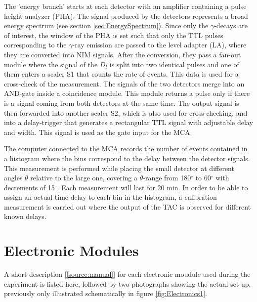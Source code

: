 \documentclass[a4paper,parskip,11pt, DIV12]{scrreprt}
\begin{document}
 The 'energy branch' starts at each detector with an amplifier containing a pulse height analyzer (PHA). The signal produced by the detectors represents a broad energy spectrum (see section \ref{sec:EnergySpectrum}). Since only the $\gamma$-decays are of interest, the window of the PHA is set such that only the TTL pulses corresponding to the $\gamma$-ray emission are passed to the level adapter (LA), where they are converted into NIM signals. After the conversion, they pass a fan-out module where the signal of the $D_l$ is split into two identical pulses and one of them enters a scaler S1 that counts the rate of events. This data is used for a cross-check of the measurement. The signals of the two detectors merge into an AND-gate inside a coincidence module. This module returns a pulse only if there is a signal coming from both detectors at the same time. The output signal is then forwarded into another scaler S2, which is also used for cross-checking, and into a delay-trigger that generates a rectangular TTL signal with adjustable delay and width. This signal is used as the gate input for the MCA.

The computer connected to the MCA records the number of events contained in a histogram where the bins correspond to the delay between the detector signals. This measurement is performed while placing the small detector at different angles $\theta$ relative to the large one, covering a $\theta$-range from 180$^\circ$ to 60$^\circ$ with decrements of 15$^\circ$. Each measurement will last for 20 min. In order to be able to assign an actual time delay to each bin in the histogram, a calibration measurement is carried out where the output of the TAC is observed for different known delays. 


\section{Electronic Modules} \label{sec:modules}

A short description [\ref{source:manual}] for each electronic moudule used during the experiment is listed here, followed by two photographs showing the actual set-up, previously only illustrated schematically in figure \ref{fig:Electronics1}.
\end{document}
